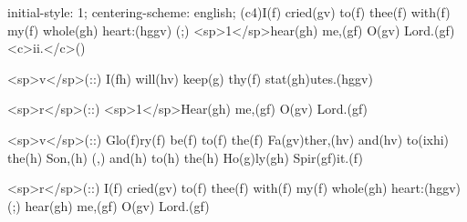 initial-style: 1;
centering-scheme: english;
(c4)I(f) cried(gv) to(f) thee(f) with(f) my(f) whole(gh) heart:(hggv) (;) <sp>1</sp>hear(gh) me,(gf) O(gv) Lord.(gf) <c>ii.</c>()

<sp>v</sp>(::) I(fh) will(hv) keep(g) thy(f) stat(gh)utes.(hggv)

<sp>r</sp>(::) <sp>1</sp>Hear(gh) me,(gf) O(gv) Lord.(gf)

<sp>v</sp>(::) Glo(f)ry(f) be(f) to(f) the(f) Fa(gv)ther,(hv) and(hv) to(ixhi) the(h) Son,(h) (,) and(h) to(h) the(h) Ho(g)ly(gh) Spir(gf)it.(f)

<sp>r</sp>(::) I(f) cried(gv) to(f) thee(f) with(f) my(f) whole(gh) heart:(hggv) (;) hear(gh) me,(gf) O(gv) Lord.(gf)